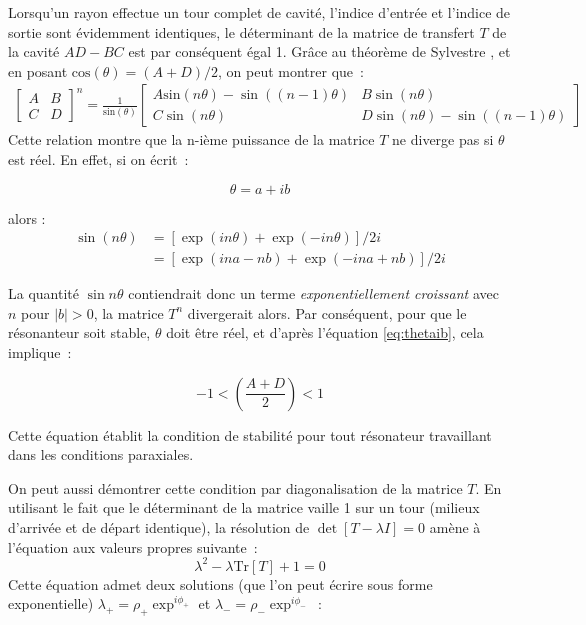 \documentclass[a4paper]{book}
\newcommand{\Tr}[1]{\mathrm{Tr}\left[{#1}\right]}
\begin{document}
Lorsqu'un rayon effectue un tour complet de cavité, l'indice d'entrée et l'indice de sortie sont évidemment identiques, le déterminant de la matrice de transfert $T$ de la cavité $AD-BC$ est par conséquent égal  1. Grâce au théorème de Sylvestre \cite{bornwolf}, et en posant $\mathrm{cos}(\theta) = (A+D)/2$, on peut montrer que~:
\begin{gather}
  \begin{bmatrix}
   A & B \\
   C & D 
   \end{bmatrix}^n
 =\frac{1}{\mathrm{sin}(\theta)}
   \begin{bmatrix}
   A \mathrm{sin}(n\theta) - \sin\left((n-1)\theta\right) & B\sin (n\theta) \\
   C\sin (n\theta) & D\sin (n\theta) - \sin\left((n-1)\theta \right)
   \end{bmatrix}
\end{gather}
Cette relation montre que la n-ième puissance de la matrice $T$ ne diverge pas si $\theta$ est réel. En effet, si on écrit~:

\begin{equation}
\label{eq:thetaib}
    \theta = a + ib
\end{equation}

alors : 
\begin{align*}
     \sin (n\theta) &= \left[\exp(in\theta)+\exp(-in\theta)\right]/2i \\
     &=\left[\exp(ina - nb)+\exp(-ina + nb)\right]/2i 
\end{align*}

La quantité $\sin n\theta$ contiendrait donc un terme \textit{exponentiellement croissant} avec $n$ pour $|b|>0$, la matrice $T^n$ divergerait alors. Par conséquent, pour que le résonanteur soit stable, $\theta$ doit être réel, et d'après l'équation \ref{eq:thetaib}, cela implique~:

\begin{equation}
\label{eq:stab}
 -1<\left(\frac{A+D}{2}\right)<1
\end{equation}

Cette équation établit la condition de stabilité pour tout résonateur travaillant dans les conditions paraxiales. 


On peut aussi démontrer cette condition par diagonalisation de la matrice $T$. 
En utilisant le fait que le déterminant de la matrice vaille 1 sur un tour (milieux d'arrivée et de départ identique), la résolution de $\det\left[T-\lambda I\right] = 0$ amène à l'équation aux valeurs propres suivante~:
\begin{equation}
\lambda^2- \lambda \Tr{T}+1 = 0
\end{equation}
Cette équation admet deux solutions (que l'on peut écrire sous forme exponentielle) $\lambda_+ = \rho_+\exp^{i\phi_+}$ et  $\lambda_- = \rho_-\exp^{i\phi_-}$~: 
\end{document}
